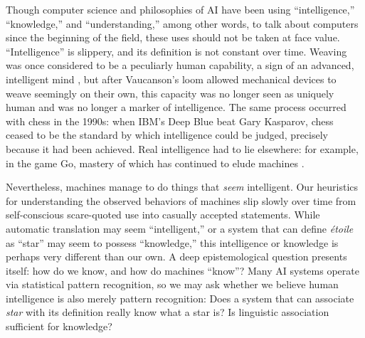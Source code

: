 Though computer science and philosophies of AI have been using
``intelligence,'' ``knowledge,'' and ``understanding,'' among other
words, to talk about computers since the beginning of the field, these
uses should not be taken at face value. ``Intelligence'' is slippery,
and its definition is not constant over time. Weaving was once considered to be a
peculiarly human capability, a sign of an advanced, intelligent
mind \cite[p. 627]{riskinDuck}, but after Vaucanson's loom allowed mechanical devices to weave
seemingly on their own, this capacity was no longer seen as uniquely
human and was no longer a marker of intelligence. The same process
occurred with chess in the 1990s: when IBM's Deep Blue beat Gary
Kasparov, chess ceased to be the standard by which intelligence could
be judged, precisely because it had been achieved. Real intelligence
had to lie elsewhere: for example, in the game Go, mastery of which
has continued to elude machines \cite[p. 623]{riskinDuck}.


Nevertheless, machines manage to do things that \emph{seem}
intelligent. Our heuristics for understanding the observed 
behaviors of machines slip slowly over time from self-conscious
scare-quoted use into casually accepted statements. While automatic
translation may seem ``intelligent,'' or a system that can define \emph{\'{e}toile}
as ``star'' may seem to possess ``knowledge,'' this intelligence or
knowledge is perhaps very different than our own. A deep
epistemological question presents itself: how do we know, and how do
machines ``know''? Many AI systems operate via statistical pattern
recognition, so we may ask  whether we believe human intelligence is
also merely pattern recognition: Does a system that can associate \emph{star}
with its definition really know what a star is? Is linguistic
association sufficient for knowledge?


